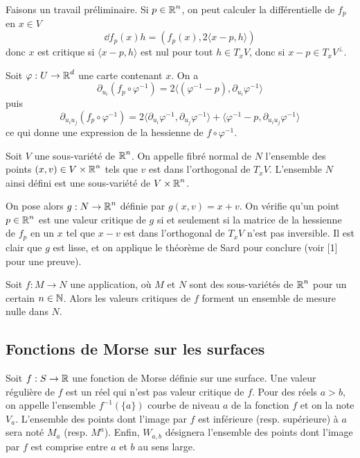 Faisons un travail préliminaire. Si $p\in\operatorname{\mathbb R}^n$, on peut calculer la différentielle de $f_p$ en 
$x\in V$
\[
    \dd f_p(x)h=(f_p(x),2\langle x-p,h\rangle)
\]
donc $x$ est critique si $\langle x-p,h\rangle$ est nul pour tout $h\in T_xV$, donc si 
$x-p\in T_xV^\bot$.

Soit $\varphi:U\to \operatorname{\mathbb R}^d$ une carte contenant $x$. On a 
\[
    \partial_{u_i}(f_p\circ\varphi^{-1})=
    2\langle (\varphi^{-1}-p),\partial_{u_i}\varphi^{-1}\rangle
\]
puis
\[
    \partial_{u_iu_j}(f_p\circ\varphi^{-1})=
    2\langle\partial_{u_i}\varphi^{-1},\partial_{u_j}\varphi^{-1}\rangle
    +\langle\varphi^{-1}-p,\partial_{u_iu_j}\varphi^{-1}\rangle\tag*{(1)}
\]
ce qui donne une expression de la hessienne de $f\circ\varphi^{-1}$. 

\begin{defi}
    Soit $V$ une sous-variété de $\operatorname{\mathbb R}^n$. 
    On appelle fibré normal de $N$ l'ensemble des points $(x,v)\in V\times\operatorname{\mathbb R}^n$ tels que $v$ 
    est dans l'orthogonal de $T_xV$. 
    L'ensemble $N$ ainsi défini est une sous-variété de $V\times\operatorname{\mathbb R}^n$.
\end{defi}

On pose alors $g:N\to\operatorname{\mathbb R}^n$ définie par $g(x,v)=x+v$. 
On vérifie qu'un point $p\in\operatorname{\mathbb R}^n$ est une valeur critique de $g$ si et seulement si 
la matrice de la hessienne de $f_p$ en un $x$ tel que $x-v$ est dans l'orthogonal de 
$T_xV$ n'est pas inversible.
Il est clair que $g$ est lisse, et on applique le théorème de Sard pour conclure (voir [1]
pour une preuve).

\begin{thm}[de Sard]
    Soit $f:M\to N$ une application, où $M$ et $N$ sont des sous-variétés de 
    $\operatorname{\mathbb R}^n$ pour un certain $n\in\operatorname{\mathbb N}$.
    Alors les valeurs critiques de $f$ forment un ensemble de mesure nulle dans $N$.
\end{thm}

\subsection{Fonctions de Morse sur les surfaces}

Soit $f:S\to\operatorname{\mathbb R}$ une fonction de Morse définie sur une surface. 
Une valeur régulière de $f$ est un réel qui n'est pas valeur critique de $f$. 
Pour des réels $a>b$, on appelle l'ensemble $f^{-1}(\lbrace a \rbrace)$ courbe de niveau 
$a$ de la fonction $f$ et on la note $V_a$. 
L'ensemble des points dont l'image par $f$ est inférieure (resp. supérieure) à $a$ sera noté $M_a$
(resp. $M^a$). 
Enfin, $W_{a,b}$ désignera l'ensemble des points dont l'image par $f$ est comprise entre 
$a$ et $b$ au sens large. 


